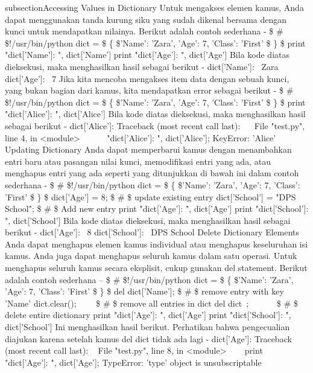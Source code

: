 subsection{Accessing Values in Dictionary}
Untuk mengakses elemen kamus, Anda dapat menggunakan tanda kurung siku yang sudah dikenal bersama dengan kunci untuk mendapatkan nilainya. Berikut adalah contoh sederhana -
  \$  \#  \$!/usr/bin/python
  dict =  \$  \{  \$'Name': 'Zara', 'Age': 7, 'Class': 'First' \$  \}  \$ 
 print "dict['Name']: ", dict['Name'] 
 print "dict['Age']: ", dict['Age'] 
Bila kode diatas dieksekusi, maka menghasilkan hasil sebagai berikut -
dict['Name']:~ Zara
dict['Age']:~ 7 
Jika kita mencoba mengakses item data dengan sebuah kunci, yang bukan bagian dari kamus, kita mendapatkan error sebagai berikut -
   \$  \#  \$!/usr/bin/python
 dict =  \$  \{  \$'Name': 'Zara', 'Age': 7, 'Class': 'First' \$  \}  \$ 
print "dict['Alice']: ", dict['Alice']
Bila kode diatas dieksekusi, maka menghasilkan hasil sebagai berikut -
dict['Alice']: 
Traceback (most recent call last):
~~ File "test.py", line 4, in <module>
~~~~~  \print "dict['Alice']: ", dict['Alice']; 
 KeyError: 'Alice' 
Updating Dictionary
Anda dapat memperbarui kamus dengan menambahkan entri baru atau pasangan nilai kunci, memodifikasi entri yang ada, atau menghapus entri yang ada seperti yang ditunjukkan di bawah ini dalam contoh sederhana -
\$  \#  \$!/usr/bin/python 
  dict =  \$  \{  \$'Name': 'Zara', 'Age': 7, 'Class': 'First' \$  \}  \$ 
  dict['Age'] = 8;  \$  \#  \$ update existing entry
  dict['School'] = "DPS School";  \$  \#  \$ Add new entry
  print "dict['Age']: ", dict['Age']
  print "dict['School']: ", dict['School'] 
Bila kode diatas dieksekusi, maka menghasilkan hasil sebagai berikut - 
  dict['Age']:~ 8 
  dict['School']:~ DPS School 
Delete Dictionary Elements 
Anda dapat menghapus elemen kamus individual atau menghapus keseluruhan isi kamus. Anda juga dapat menghapus seluruh kamus dalam satu operasi. 
Untuk menghapus seluruh kamus secara eksplisit, cukup gunakan del statement. Berikut adalah contoh sederhana – 
   \$  \#  \$!/usr/bin/python
  dict =  \$  \{  \$'Name': 'Zara', 'Age': 7, 'Class': 'First' \$  \}  \$
  del dict['Name'];  \$  \#  \$ remove entry with key 'Name'
  dict.clear();~~~~  \$  \#  \$ remove all entries in dict 
  del dict~;~~~~~~   \$  \#  \$ delete entire dictionary 
  print "dict['Age']: ", dict['Age'] 
  print "dict['School']: ", dict['School'] 
Ini menghasilkan hasil berikut. Perhatikan bahwa pengecualian diajukan karena setelah kamus del dict tidak ada lagi - 
  dict['Age']: 
  Traceback (most recent call last): 
~   File "test.py", line 8, in <module> 
~~~     print "dict['Age']: ", dict['Age']; 
  TypeError: 'type' object is unsubscriptable 
